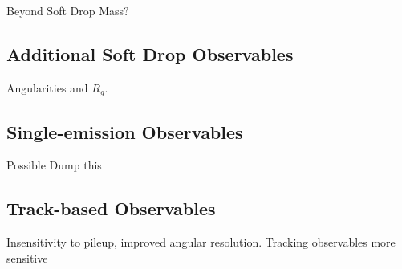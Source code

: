 
Beyond Soft Drop Mass?

\subsection{Additional Soft Drop Observables}

Angularities and $R_g$.

\subsection{Single-emission Observables}

Possible Dump this

\subsection{Track-based Observables}

Insensitivity to pileup, improved angular resolution.
	Tracking observables more sensitive


